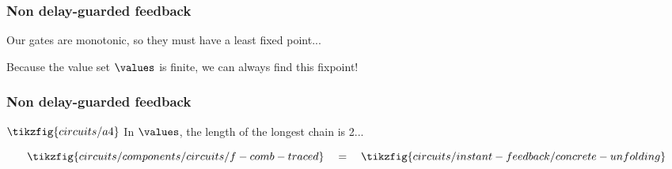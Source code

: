 \begin{frame}
    \frametitle{Non delay-guarded feedback}

    \wait

    Our gates are \alert{monotonic}, so they must have a \alert{least fixed point}...

    \wait

    Because the value set \(\values\) is finite, we can always find this fixpoint!    
    
\end{frame}

\begin{frame}
    \frametitle{Non delay-guarded feedback}

    \(
        \tikzfig{circuits/a4}    
    \)
    \quad
    In \(\values\), the length of the longest chain is \alert{2}...

    \wait

    \[
        \tikzfig{circuits/components/circuits/f-comb-traced}
        \quad=\quad
        \tikzfig{circuits/instant-feedback/concrete-unfolding}
    \]
    

\end{frame}

\newcommand{\transition}{\Downarrow}


